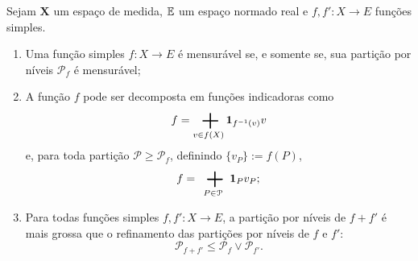 \begin{proposition}
Sejam $\bm X$ um espaço de medida, $\mathbb{E}$ um espaço normado real e $f,f'\colon X \to E$ funções simples.
	\begin{enumerate}
	\item Uma função simples $f\colon X \to E$ é mensurável se, e somente se, sua partição por níveis $\mathcal P_f$ é mensurável;
	
	\item A função $f$ pode ser decomposta em funções indicadoras como
		\begin{equation*}
		f = \sum_{v \in f(X)} \idc_{f\inv(v)} v
		\end{equation*}
e, para toda partição $\mathcal P \geq \mathcal P_f$, definindo $\{v_P\} := f(P)$,
		\begin{equation*}
		f = \sum_{P \in \mathcal P} \idc_P v_P;
		\end{equation*}
	
	\item Para todas funções simples $f,f'\colon X \to E$, a partição por níveis de $f+f'$ é mais grossa que o refinamento das partições por níveis de $f$ e $f'$:
		\begin{equation*}
		\mathcal P_{f+f'} \leq \mathcal P_f \vee \mathcal P_{f'}.
		\end{equation*}
	\end{enumerate}
\end{proposition}
